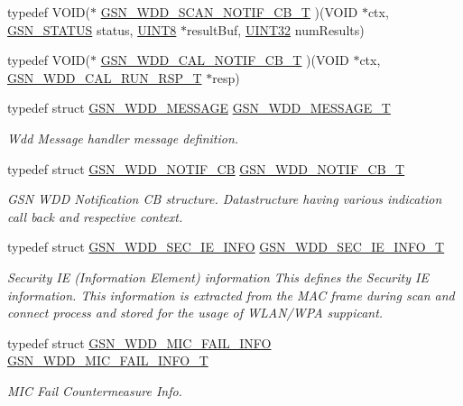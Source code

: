 \begin{DoxyCompactItemize}
\item 
typedef VOID($\ast$ \hyperlink{a00603_a4929f46818bd2e51f1d25fecc36d30d6}{GSN\_\-WDD\_\-SCAN\_\-NOTIF\_\-CB\_\-T} )(VOID $\ast$ctx, \hyperlink{a00660_gada5951904ac6110b1fa95e51a9ddc217}{GSN\_\-STATUS} status, \hyperlink{a00660_gab27e9918b538ce9d8ca692479b375b6a}{UINT8} $\ast$resultBuf, \hyperlink{a00660_gae1e6edbbc26d6fbc71a90190d0266018}{UINT32} numResults)
\item 
typedef VOID($\ast$ \hyperlink{a00603_a1dbcda6416e95d84f0c8f8f8dcad8a18}{GSN\_\-WDD\_\-CAL\_\-NOTIF\_\-CB\_\-T} )(VOID $\ast$ctx, \hyperlink{a00320}{GSN\_\-WDD\_\-CAL\_\-RUN\_\-RSP\_\-T} $\ast$resp)
\item 
typedef struct \hyperlink{a00277}{GSN\_\-WDD\_\-MESSAGE} \hyperlink{a00677_ga6dc6666c98a822d61766d4b3a8b6d2d5}{GSN\_\-WDD\_\-MESSAGE\_\-T}
\begin{DoxyCompactList}\small\item\em Wdd Message handler message definition. \end{DoxyCompactList}\item 
typedef struct \hyperlink{a00281}{GSN\_\-WDD\_\-NOTIF\_\-CB} \hyperlink{a00677_gab57828609030c2fd2947208559792aec}{GSN\_\-WDD\_\-NOTIF\_\-CB\_\-T}
\begin{DoxyCompactList}\small\item\em GSN WDD Notification CB structure. Datastructure having various indication call back and respective context. \end{DoxyCompactList}\item 
typedef struct \hyperlink{a00292}{GSN\_\-WDD\_\-SEC\_\-IE\_\-INFO} \hyperlink{a00677_ga70a9458f62036ad38be0efc8a1b65560}{GSN\_\-WDD\_\-SEC\_\-IE\_\-INFO\_\-T}
\begin{DoxyCompactList}\small\item\em Security IE (Information Element) information This defines the Security IE information. This information is extracted from the MAC frame during scan and connect process and stored for the usage of WLAN/WPA suppicant. \end{DoxyCompactList}\item 
typedef struct \hyperlink{a00278}{GSN\_\-WDD\_\-MIC\_\-FAIL\_\-INFO} \hyperlink{a00677_gae12a0e2aa7d3d161be1342b19d044cfb}{GSN\_\-WDD\_\-MIC\_\-FAIL\_\-INFO\_\-T}
\begin{DoxyCompactList}\small\item\em MIC Fail Countermeasure Info. \end{DoxyCompactList}\item 

\end{DoxyCompactItemize}
